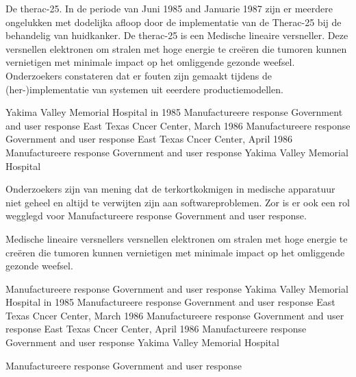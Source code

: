 \cite{adformatie280220209communicatiegebreken}
\cite{spinnael25022009onderzoekpolderbaancrash}
\cite{crashTurkishAirlines}
\cite{flightradar24}
\cite{flightstatstracker}
\newline \indent De therac-25. In de periode van Juni 1985 and Januarie 1987 zijn er meerdere ongelukken met dodelijka afloop door de implementatie van de Therac-25 bij de behandelig van huidkanker.
De therac-25 is een Medische lineaire versneller. Deze  versnellen elektronen om stralen met hoge energie te creëren die tumoren kunnen vernietigen met minimale impact op het omliggende gezonde weefsel.
Onderzoekers constateren dat er fouten zijn gemaakt tijdens de (her-)implementatie van systemen uit eeerdere productiemodellen.


Yakima Valley Memorial Hospital in 1985
Manufactureere response
Government and user response
East Texas Cncer Center, March 1986
Manufactureere response
Government and user response
East Texas Cncer Center, April 1986
Manufactureere response
Government and user response
Yakima Valley Memorial Hospital

Onderzoekers zijn van mening dat de terkortkokmigen in medische apparatuur niet geheel en altijd te verwijten zijn aan softwareproblemen. Zor is er ook een rol wegglegd voor Manufactureere response
Government and user response.

Medische lineaire versnellers versnellen elektronen om stralen met hoge energie te creëren die tumoren kunnen vernietigen met minimale impact op het omliggende gezonde weefsel.

Manufactureere response
Government and user response
Yakima Valley Memorial Hospital in 1985
Manufactureere response
Government and user response
East Texas Cncer Center, March 1986
Manufactureere response
Government and user response
East Texas Cncer Center, April 1986
Manufactureere response
Government and user response
Yakima Valley Memorial Hospital

Manufactureere response
Government and user response


